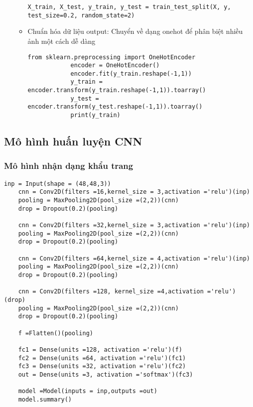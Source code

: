 \begin{itemize}
\begin{itemize}
		 \begin{lstlisting}[style=codePython]
		 	X_train, X_test, y_train, y_test = train_test_split(X, y, test_size=0.2, random_state=2)			
		 \end{lstlisting}
	 
	 	\item Chuẩn hóa dữ liệu output: Chuyển về dạng onehot để phân biệt nhiều ảnh một cách dễ dàng  
	 	
	 	\begin{lstlisting}[style=codePython]
	 		from sklearn.preprocessing import OneHotEncoder
	 		encoder = OneHotEncoder()
	 		encoder.fit(y_train.reshape(-1,1))
	 		y_train = encoder.transform(y_train.reshape(-1,1)).toarray()
	 		y_test = encoder.transform(y_test.reshape(-1,1)).toarray()
	 		print(y_train) 				
	 	\end{lstlisting}		
	\end{itemize}
\end{itemize} 

\subsection{Mô hình huấn luyện CNN}

\subsubsection{Mô hình nhận dạng khẩu trang}

\begin{lstlisting}[style=codePython]
	inp = Input(shape = (48,48,3))
	cnn = Conv2D(filters =16,kernel_size = 3,activation ='relu')(inp)
	pooling = MaxPooling2D(pool_size =(2,2))(cnn)
	drop = Dropout(0.2)(pooling)
	
	cnn = Conv2D(filters =32,kernel_size = 3,activation ='relu')(inp)
	pooling = MaxPooling2D(pool_size =(2,2))(cnn)
	drop = Dropout(0.2)(pooling)
	
	cnn = Conv2D(filters =64,kernel_size = 4,activation ='relu')(inp)
	pooling = MaxPooling2D(pool_size =(2,2))(cnn)
	drop = Dropout(0.2)(pooling)
	
	cnn = Conv2D(filters =128, kernel_size =4,activation ='relu')(drop)
	pooling = MaxPooling2D(pool_size =(2,2))(cnn)
	drop = Dropout(0.2)(pooling)
	
	f =Flatten()(pooling)
	
	fc1 = Dense(units =128, activation ='relu')(f)
	fc2 = Dense(units =64, activation ='relu')(fc1)
	fc3 = Dense(units =32, activation ='relu')(fc2)
	out = Dense(units =3, activation ='softmax')(fc3)
	
	model =Model(inputs = inp,outputs =out)
	model.summary()	 				
\end{lstlisting}

